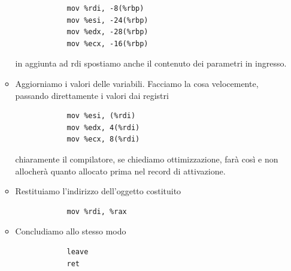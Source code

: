 \begin{itemize}
\begin{itemize}
\begin{verbatim}
			mov %rdi, -8(%rbp)
			mov %esi, -24(%rbp)
			mov %edx, -28(%rbp)
			mov %ecx, -16(%rbp)
		\end{verbatim}
		in aggiunta ad rdi spostiamo anche il contenuto dei parametri in ingresso. 
		\item Aggiorniamo i valori delle variabili. Facciamo la cosa velocemente, passando direttamente i valori dai registri
		\begin{verbatim}
			mov %esi, (%rdi)
			mov %edx, 4(%rdi)
			mov %ecx, 8(%rdi)
		\end{verbatim}
		chiaramente il compilatore, se chiediamo ottimizzazione, farà così e non allocherà quanto allocato prima nel record di attivazione.
		\item Restituiamo l'indirizzo dell'oggetto costituito
		\begin{verbatim}
			mov %rdi, %rax
		\end{verbatim}
		\item Concludiamo allo stesso modo
		\begin{verbatim}
			leave
			ret
		\end{verbatim}
	\end{itemize}
\end{itemize}
